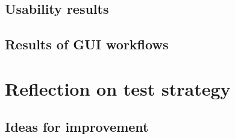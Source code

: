 \subsection{Usability results}
\label{Testing_Results_Usability}

\subsection{Results of GUI workflows}
\label{Testing_Results_Workflows}

\section{Reflection on test strategy}
\label{Testing_Reflection}

\subsection{Ideas for improvement}
\label{Testing_Reflection_improvements}